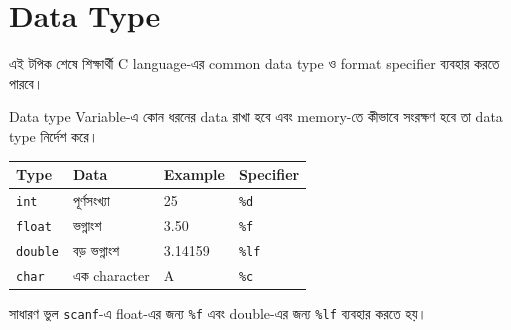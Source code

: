 \section{Data Type}

\begin{learningbox}
এই টপিক শেষে শিক্ষার্থী C language-এর common data type ও format specifier ব্যবহার করতে পারবে।
\end{learningbox}

\begin{definitionbox}{Data type}
Variable-এ কোন ধরনের data রাখা হবে এবং memory-তে কীভাবে সংরক্ষণ হবে তা data type নির্দেশ করে।
\end{definitionbox}

\begin{center}
\begin{tabular}{|p{}|p{}|p{}|p{}|}
\hline
\textbf{Type} & \textbf{Data} & \textbf{Example} & \textbf{Specifier} \\
\hline
\texttt{int} & পূর্ণসংখ্যা & 25 & \texttt{\%d} \\
\hline
\texttt{float} & ভগ্নাংশ & 3.50 & \texttt{\%f} \\
\hline
\texttt{double} & বড় ভগ্নাংশ & 3.14159 & \texttt{\%lf} \\
\hline
\texttt{char} & এক character & A & \texttt{\%c} \\
\hline
\end{tabular}
\end{center}

\begin{mistakebox}{সাধারণ ভুল}
\texttt{scanf}-এ float-এর জন্য \texttt{\%f} এবং double-এর জন্য \texttt{\%lf} ব্যবহার করতে হয়।
\end{mistakebox}
